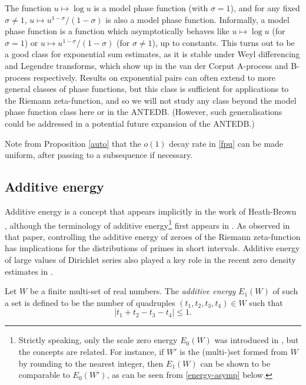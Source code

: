 \documentclass[a4paper, 10pt]{amsart}
\begin{document}
    \begin{example}\label{phase-ex} The function $u \mapsto \log u$ is a model phase function (with $\sigma=1$), and for any fixed $\sigma \neq 1$, $u \mapsto u^{1-\sigma}/(1-\sigma)$ is also a model phase function.  Informally, a model phase function is a function which asymptotically behaves like $u \mapsto \log u$ (for $\sigma = 1$) or $u \mapsto u^{1-\sigma}/(1-\sigma)$ (for $\sigma \neq 1$), up to constants.  This turns out to be a good class for exponential sum estimates, as it is stable under Weyl differencing and Legendre transforms, which show up in the van der Corput A-process and B-process respectively.  Results on exponential pairs can often extend to more general classes of phase functions, but this class is sufficient for applications to the Riemann zeta-function, and so we will not study any class beyond the model phase function class here or in the ANTEDB.  (However, such generalisations could be addressed in a potential future expansion of the ANTEDB.)
    \end{example}

    Note from Proposition \ref{auto} that the $o(1)$ decay rate in \eqref{fpu} can be made uniform, after passing to a subsequence if necessary.


\subsection{Additive energy}\label{add-sec}

Additive energy is a concept that appears implicitly in the work of Heath-Brown \cite{heath_brown_consecutive_II}, although the terminology of additive energy\footnote{Strictly speaking, only the scale zero energy $E_0(W)$ was introduced in \cite{tao-vu}, but the concepts are related.  For instance, if $W'$ is the (multi-)set formed from $W$ by rounding to the nearest integer, then $E_1(W)$ can be shown to be comparable to $E_0(W')$, as can be seen from \eqref{energy-asymp} below.} first appears in \cite{tao-vu}.  As observed in that paper, controlling the additive energy of zeroes of the Riemann zeta-function has implications for the distributions of primes in short intervals.  Additive energy of large values of Dirichlet series also played a key role in the recent zero density estimates in \cite{guth-maynard}.

\begin{definition}\label{energy-def}  Let $W$ be a finite multi-set of real numbers.  The \emph{additive energy} $E_1(W)$ of such a set is defined to be the number of quadruples $(t_1,t_2,t_3,t_4) \in W$ such that
    $$    |t_1 + t_2 - t_3 - t_4| \leq 1.$$
\end{definition}
\end{document}
